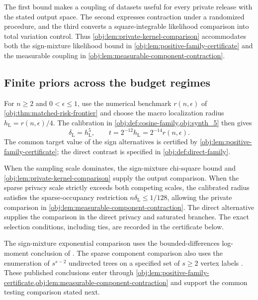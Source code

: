 \documentclass[11pt]{article}
\begin{document}
The first bound makes a coupling of datasets useful for every private release with the stated output space. The second expresses contraction under a randomized procedure, and the third converts a square-integrable likelihood comparison into total variation control. Thus \cref{obj:lem:private-kernel-comparison} accommodates both the sign-mixture likelihood bound in \cref{obj:lem:positive-family-certificate} and the measurable coupling in \cref{obj:lem:measurable-component-contraction}.

\subsection{Finite priors across the budget regimes}

For \(n\ge2\) and \(0<\epsilon\le1\), use the numerical benchmark \(r(n,\epsilon)\) of \cref{obj:thm:matched-risk-frontier} and choose the macro localization radius \(h_{\mathrm L}=r(n,\epsilon)/4\). The calibration in \cref{obj:def:cosine-family,obj:synth_5} then gives
\[
\delta_{\mathrm L}=h_{\mathrm L}^{5},
\qquad
t=2^{-12}h_{\mathrm L}
=2^{-14}r(n,\epsilon).
\]
The common target value of the sign alternatives is certified by \cref{obj:lem:positive-family-certificate}; the direct contrast is specified in \cref{obj:def:direct-family}.

When the sampling scale dominates, the sign-mixture chi-square bound and \cref{obj:lem:private-kernel-comparison} supply the output comparison. When the sparse privacy scale strictly exceeds both competing scales, the calibrated radius satisfies the sparse-occupancy restriction \(n\delta_{\mathrm L}\le1/128\), allowing the private comparison in \cref{obj:lem:measurable-component-contraction}. The direct alternative supplies the comparison in the direct privacy and saturated branches. The exact selection conditions, including ties, are recorded in the certificate below.

The sign-mixture exponential comparison uses the bounded-differences log-moment conclusion of \citet[Theorem 6.2, displayed log-mgf conclusion in its proof, p.~167]{BoucheronLugosiMassart2013}. The sparse component comparison also uses the enumeration of \(s^{s-2}\) undirected trees on a specified set of \(s\ge2\) vertex labels \citep[Section 5.6, Theorem 5.40]{KellerTrotterAppliedCombinatorics}. These published conclusions enter through \cref{obj:lem:positive-family-certificate,obj:lem:measurable-component-contraction} and support the common testing comparison stated next.
\end{document}
